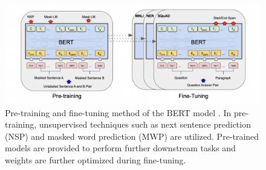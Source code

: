 \documentclass[%
	BCOR=8mm, %
	DIV=12,
	toc=bibliography, %
	toc=listof, %
	oneside, %
	egregdoesnotlikesansseriftitles, %
	]{scrbook}
\begin{document}
\begin{figure}[h!]
    \centering
    \includegraphics[width=0.9\linewidth]{img/pre_fintune.png}
    \caption[Diagram of of pre-training and fine-tuning of BERT model]{ \small Pre-training and fine-tuning method of the BERT model \cite{devlin_bert_2019-1}. In pre-training, unsupervised techniques such as next sentence prediction (NSP) and masked word prediction (MWP) are utilized. Pre-trained models are provided to perform further downstream tasks and weights are further optimized during fine-tuning.}
    \label{fig:prefintune}
\end{figure}
\end{document}
